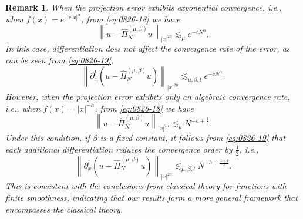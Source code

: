 \documentclass[pdflatex,sn-aps]{sn-jnl}%
\theoremstyle{thmstyleone}%
\theoremstyle{thmstyletwo}%
\newtheorem{remark}{Remark}%
\theoremstyle{thmstylethree}%
\begin{document}
\begin{remark}
  When the projection error exhibits exponential convergence, i.e.,
  when $f(x) = e^{-c|x|^\alpha}$, from \eqref{eq:0826-18} we have 
  \begin{displaymath}
    \left\|u-\widehat{\Pi}_N^{(\mu, \beta)} u\right\|_{|x|^{2 \mu}} \lesssim_\mu e^{-cN^\alpha}.
  \end{displaymath}
  In this case, differentiation does not affect the convergence rate of the error, as can be seen from
  \eqref{eq:0826-19}, 
  \begin{displaymath}
    \left\|\partial_x^l \left(u-\widehat{\Pi}_N^{(\mu, \beta)} u\right)\right\|_{|x|^{2 \mu}} \lesssim_{\mu,\beta,l} e^{-cN^\alpha}.
  \end{displaymath}
  However, when the projection error exhibits only an algebraic convergence rate, i.e.,
  when $f(x) = |x|^{-h}$, from \eqref{eq:0826-18} we have
  \begin{displaymath}
    \left\|u-\widehat{\Pi}_N^{(\mu, \beta)} u\right\|_{|x|^{2 \mu}} \lesssim_\mu N^{-h+\frac{1}{2}}.
  \end{displaymath}
  Under this condition, if $\beta$ is a fixed constant, it follows from 
  \eqref{eq:0826-19} that each additional differentiation reduces the convergence order by
  $\frac{1}{2}$, i.e.,
  \begin{displaymath}
    \left\|\partial_x^l \left(u-\widehat{\Pi}_N^{(\mu, \beta)} u\right)\right\|_{|x|^{2 \mu}} \lesssim_{\mu,\beta,l} N^{-h+\frac{1+l}{2}}.
  \end{displaymath}
  This is consistent with the conclusions from classical theory for functions with finite smoothness, indicating that our results form a more general framework that encompasses the classical theory.
\end{remark}
\end{document}
